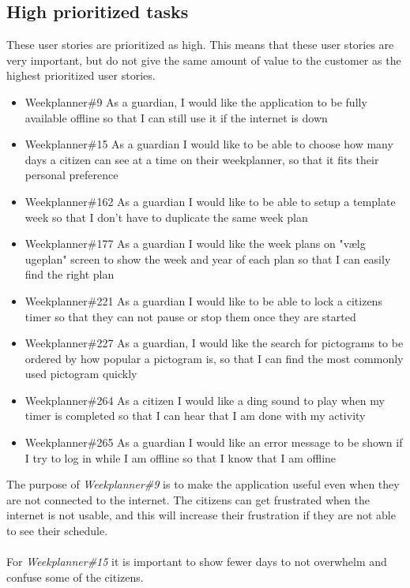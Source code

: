 \subsection{High prioritized tasks}
These user stories are prioritized as high. 
This means that these user stories are very important, but do not give the same amount of value to the customer as the highest prioritized user stories.
\begin{itemize}
    \item Weekplanner\#9 As a guardian, I would like the application to be fully available offline so that I can still use it if the internet is down
    \item Weekplanner\#15 As a guardian I would like to be able to choose how many days a citizen can see at a time on their weekplanner, so that it fits their personal preference 
    \item Weekplanner\#162 As a guardian I would like to be able to setup a template week so that I don't have to duplicate the same week plan  
    \item Weekplanner\#177 As a guardian I would like the week plans on "vælg ugeplan" screen to show the week and year of each plan so that I can easily find the right plan 
    \item Weekplanner\#221 As a guardian I would like to be able to lock a citizens timer so that they can not pause or stop them once they are started
    \item Weekplanner\#227 As a guardian, I would like the search for pictograms to be ordered by how popular a pictogram is, so that I can find the most commonly used pictogram quickly
    \item Weekplanner\#264 As a citizen I would like a ding sound to play when my timer is completed so that I can hear that I am done with my activity
    \item Weekplanner\#265 As a guardian I would like an error message to be shown if I try to log in while I am offline so that I know that I am offline
\end{itemize}
\noindent
The purpose of \textit{Weekplanner\#9} is to make the application useful even when they are not connected to the internet.
The citizens can get frustrated when the internet is not usable, and this will increase their frustration if they are not able to see their schedule.
\\\\
For \textit{Weekplanner\#15} it is important to show fewer days to not overwhelm and confuse some of the citizens.
